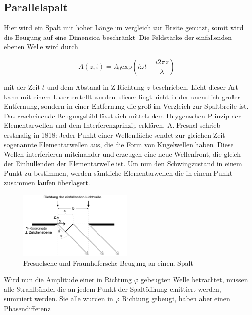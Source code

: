     \subsection{Parallelspalt}

        \noindent Hier wird ein Spalt mit hoher Länge im vergleich zur Breite genutzt, somit wird die Beugung auf eine Dimension beschränkt.
        Die Feldstärke der einfallenden ebenen Welle wird durch 

        \begin{equation*}
            A(z,t) = A_0 \text{exp}\left(i \omega t - \frac{i 2\pi z}{\lambda}\right)
        \end{equation*}

        \noindent mit der Zeit $t$ und dem Abstand in Z-Richtung $z$ beschrieben. Licht dieser Art kann mit einem Laser erstellt werden, 
        dieser liegt nicht in der unendlich großer Entfernung, sondern in einer Entfernung die groß im Vergleich zur Spaltbreite ist. 
        Das erscheinende Beugungsbild lässt sich mittels dem Huygenschen Prinzip der Elementarwellen und dem Interferenzprinzip 
        erklären. A. Fresnel schrieb erstmalig in 1818: Jeder Punkt einer Wellenfläche sendet zur gleichen Zeit sogenannte Elementarwellen aus, 
        die die Form von Kugelwellen haben. Diese Wellen interferieren miteinander und erzeugen eine neue Wellenfront, die gleich der Einhüllenden
        der Elementarwelle ist. Um nun den Schwingzustand in einem Punkt zu bestimmen, werden sämtliche Elementarwellen die in einem Punkt zusammen 
        laufen überlagert.

        \begin{figure}[ht]
            \centering
            \includegraphics[width=0.5\textwidth]{latex/images/einzel.PNG}
            \caption{Fresnelsche und Fraunhofersche Beugung an einem Spalt\protect \cite{V406}.}
            \label{img:einzel}
        \end{figure}

        \noindent Wird nun die Amplitude einer in Richtung $\varphi$ gebeugten Welle betrachtet, müssen alle Strahlbündel die an jedem Punkt der 
        Spaltöffnung emittiert werden, summiert werden. Sie alle wurden in $\varphi$ Richtung gebeugt, haben aber einen Phasendifferenz 


